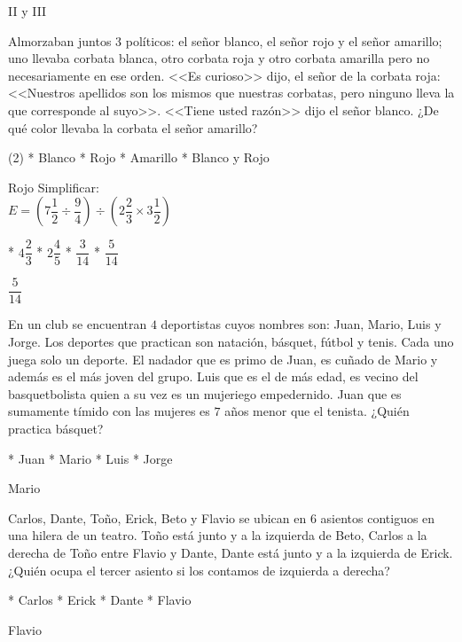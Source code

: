 II y III
\begin{mini}[.8]
	Almorzaban juntos $3$ pol\'iticos: el señor blanco, el señor rojo y el señor amarillo; uno llevaba corbata blanca, otro corbata roja y otro corbata amarilla pero no necesariamente en ese orden. <<Es curioso>> dijo, el señor de la corbata roja: <<Nuestros apellidos son los mismos que nuestras corbatas, pero ninguno lleva la que corresponde al suyo>>. <<Tiene usted raz\'on>> dijo el señor blanco. ¿De qu\'e color llevaba la corbata el señor amarillo?
\end{mini}
\begin{mini}[.6]
	\begin{enum}(2)
		* Blanco
		* Rojo
		* Amarillo
		* Blanco y Rojo
	\end{enum}
\end{mini}
Rojo
Simplificar: \vspace{5pt} \\
$E=\left(7\dfrac{1}{2}\div\dfrac{9}{4}\right)\div\left(2\dfrac{2}{3}\times 3\dfrac{1}{2}\right)$
\begin{task}
	* $4\dfrac{2}{3}$
	* $2\dfrac{4}{5}$
	* $\dfrac{3}{14}$
	* $\dfrac{5}{14}$
\end{task}
$\dfrac{5}{14}$
\begin{mini}[.8]
	En un club se encuentran $4$ deportistas cuyos nombres son: Juan, Mario, Luis y Jorge. Los deportes que practican son nataci\'on, b\'asquet, f\'utbol y tenis. Cada uno juega solo un deporte. El nadador que es primo de Juan, es cuñado de Mario y adem\'as es el m\'as joven del grupo. Luis que es el de m\'as edad, es vecino del basquetbolista quien a su vez es un mujeriego empedernido. Juan que es sumamente t\'imido con las mujeres es $7$ años menor que el tenista. ¿Qui\'en practica b\'asquet?
\end{mini}
\begin{task}
	* Juan
	* Mario
	* Luis
	* Jorge
\end{task}
Mario
\begin{mini}[.7]
	Carlos, Dante, Toño, Erick, Beto y Flavio se ubican en $6$ asientos contiguos en una hilera de un teatro. Toño est\'a junto y a la izquierda de Beto, Carlos a la derecha de Toño entre Flavio y Dante, Dante est\'a junto y a la izquierda de Erick. ¿Qui\'en ocupa el tercer asiento si los contamos de izquierda a derecha?
\end{mini}
\begin{mini}[.7]
	\begin{enum*}
		* Carlos
		* Erick
		* Dante
		* Flavio
	\end{enum*}
\end{mini}
Flavio
